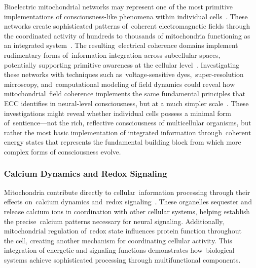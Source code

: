 Bioelectric mitochondrial networks may represent one of the most primitive implementations of consciousness-like phenomena within individual cells~\cite{Picard2014, Pokorny2012}. These networks create sophisticated patterns of~coherent electromagnetic fields through the coordinated activity of hundreds to thousands of mitochondria functioning as an integrated system~\cite{Thar2004, De_Ninno2021}. The resulting~electrical coherence domains implement rudimentary forms of~information integration across subcellular spaces, potentially supporting primitive awareness at the cellular level~\cite{Baluska2020, McFadden2020}. Investigating these networks with techniques such as~voltage-sensitive dyes,~super-resolution microscopy, and~computational modeling of field dynamics could reveal how mitochondrial~field coherence implements the same fundamental principles that ECC identifies in neural-level consciousness, but at a much simpler scale~\cite{Pokorny2014, Ivanov2021}. These investigations might reveal whether individual cells possess a minimal form of~sentience—not the rich, reflective consciousness of multicellular organisms, but rather the most basic implementation of integrated information through~coherent energy states that represents the fundamental building block from which more complex forms of consciousness evolve.

\subsubsection{Calcium Dynamics and Redox Signaling~~}

Mitochondria contribute directly to cellular~information processing through their effects on~calcium dynamics and~redox signaling~\cite{Ichas1998, pinotsis2023cytoelectric}. These organelles sequester and release calcium ions in coordination with other cellular systems, helping establish the precise~calcium patterns necessary for neural signaling. Additionally, mitochondrial regulation of~redox state influences protein function throughout the cell, creating another mechanism for coordinating cellular activity. This integration of energetic and signaling functions demonstrates how~biological systems achieve sophisticated processing through multifunctional components.

